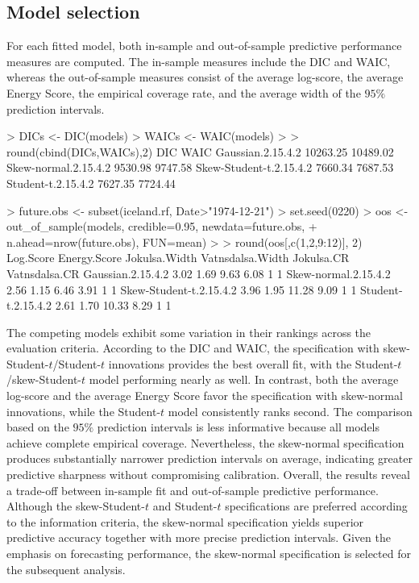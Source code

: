 \subsection{Model selection}
For each fitted model, both in-sample and out-of-sample predictive performance measures are computed. The in-sample measures include the DIC and WAIC, whereas the out-of-sample measures consist of the average log-score, the average Energy Score, the empirical coverage rate, and the average width of the $95\%$ prediction intervals.
\begin{example}
> DICs <- DIC(models)
> WAICs <- WAIC(models)
>
> round(cbind(DICs,WAICs),2)
                             DIC     WAIC
Gaussian.2.15.4.2       10263.25 10489.02
Skew-normal.2.15.4.2     9530.98  9747.58
Skew-Student-t.2.15.4.2  7660.34  7687.53
Student-t.2.15.4.2       7627.35  7724.44

> future.obs <- subset(iceland.rf, Date>"1974-12-21") 
> set.seed(0220)
> oos <- out_of_sample(models, credible=0.95, newdata=future.obs, 
+                      n.ahead=nrow(future.obs), FUN=mean)
>
> round(oos[,c(1,2,9:12)], 2)           
                    Log.Score Energy.Score Jokulsa.Width Vatnsdalsa.Width Jokulsa.CR Vatnsdalsa.CR
Gaussian.2.15.4.2        3.02         1.69          9.63             6.08          1             1
Skew-normal.2.15.4.2     2.56         1.15          6.46             3.91          1             1
Skew-Student-t.2.15.4.2  3.96         1.95         11.28             9.09          1             1
Student-t.2.15.4.2       2.61         1.70         10.33             8.29          1             1
\end{example}
The competing models exhibit some variation in their rankings across the evaluation criteria. According to the DIC and WAIC, the specification with skew-Student-$t$/Student-$t$ innovations provides the best overall fit, with the Student-$t$/skew-Student-$t$ model performing nearly as well. In contrast, both the average log-score and the average Energy Score favor the specification with skew-normal innovations, while the Student-$t$ model consistently ranks second. The comparison based on the $95\%$ prediction intervals is less informative because all models achieve complete empirical coverage. Nevertheless, the skew-normal specification produces substantially narrower prediction intervals on average, indicating greater predictive sharpness without compromising calibration. Overall, the results reveal a trade-off between in-sample fit and out-of-sample predictive performance. Although the skew-Student-$t$ and Student-$t$ specifications are preferred according to the information criteria, the skew-normal specification yields superior predictive accuracy together with more precise prediction intervals. Given the emphasis on forecasting performance, the skew-normal specification is selected for the subsequent analysis.

